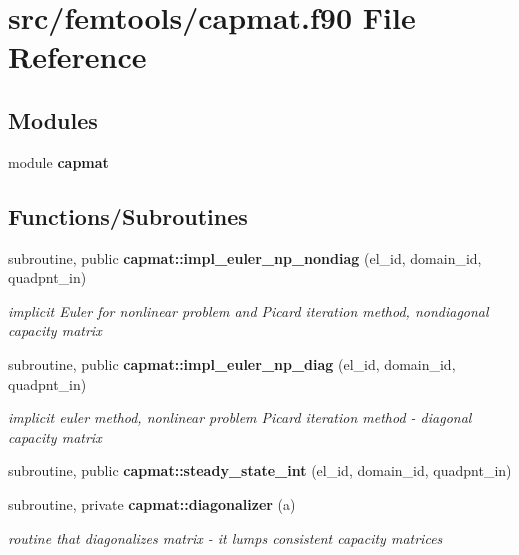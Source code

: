 \section{src/femtools/capmat.f90 File Reference}
\label{capmat_8f90}
\subsection*{Modules}
\begin{DoxyCompactItemize}
\item 
module {\bf capmat}
\end{DoxyCompactItemize}
\subsection*{Functions/\+Subroutines}
\begin{DoxyCompactItemize}
\item 
subroutine, public {\bf capmat\+::impl\+\_\+euler\+\_\+np\+\_\+nondiag} (el\+\_\+id, domain\+\_\+id, quadpnt\+\_\+in)
\begin{DoxyCompactList}\small\item\em implicit Euler for nonlinear problem and Picard iteration method, nondiagonal capacity matrix \end{DoxyCompactList}\item 
subroutine, public {\bf capmat\+::impl\+\_\+euler\+\_\+np\+\_\+diag} (el\+\_\+id, domain\+\_\+id, quadpnt\+\_\+in)
\begin{DoxyCompactList}\small\item\em implicit euler method, nonlinear problem Picard iteration method -\/ diagonal capacity matrix \end{DoxyCompactList}\item 
subroutine, public {\bf capmat\+::steady\+\_\+state\+\_\+int} (el\+\_\+id, domain\+\_\+id, quadpnt\+\_\+in)
\item 
subroutine, private {\bf capmat\+::diagonalizer} (a)
\begin{DoxyCompactList}\small\item\em routine that diagonalizes matrix -\/ it lumps consistent capacity matrices \end{DoxyCompactList}\end{DoxyCompactItemize}
